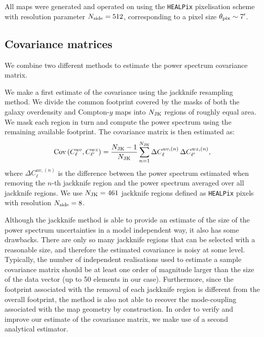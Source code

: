 \documentclass[useAMS,usenatbib]{mn2e}
\begin{document}
    All maps were generated and operated on using the {\tt HEALPix} pixelisation scheme \citep{2005ApJ...622..759G} with resolution parameter $N_{\rm side}=512$, corresponding to a pixel size $\theta_{\rm pix}\sim7'$.

  \subsection{Covariance matrices}\label{ssec:methods.cov}
    We combine two different methods to estimate the power spectrum covariance matrix. 
    
    We make a first estimate of the covariance using the jackknife resampling method. We divide the common footprint covered by the masks of both the galaxy overdensity and Compton-$y$ maps into $N_{\rm JK}$ regions of roughly equal area. We mask each region in turn and compute the power spectrum  using the remaining available footprint. The covariance matrix is then estimated as:
    \begin{equation}\label{eq:cov_jk}
      {\rm Cov}\left(C^{uv}_\ell,C^{wz}_{\ell'}\right)=\frac{N_{\rm JK}-1}{N_{\rm JK}}\sum_{n=1}^{N_{\rm JK}}\Delta C^{uv,(n)}_\ell\,\Delta C^{wz,(n)}_{\ell'},
    \end{equation}
    where $\Delta C^{uv,(n)}_\ell$ is the difference between the power spectrum estimated when removing the $n$-th jackknife region and the power spectrum averaged over all jackknife regions. We use $N_{\rm JK}=461$ jackknife regions defined as {\tt HEALPix} pixels with resolution $N_{\rm side}=8$.

    Although the jackknife method is able to provide an estimate of the size of the power spectrum uncertainties in a model independent way, it also has some drawbacks. There are only so many jackknife regions that can be selected with a reasonable size, and therefore the estimated covariance is noisy at some level. Typically, the number of independent realisations used to estimate a sample covariance matrix should be at least one order of magnitude larger than the size of the data vector (up to 50 elements in our case). Furthermore, since the footprint associated with the removal of each jackknife region is different from the overall footprint, the method is also not able to recover the mode-coupling associated with the map geometry by construction. In order to verify and improve our estimate of the covariance matrix, we make use of a second analytical estimator.
\end{document}
